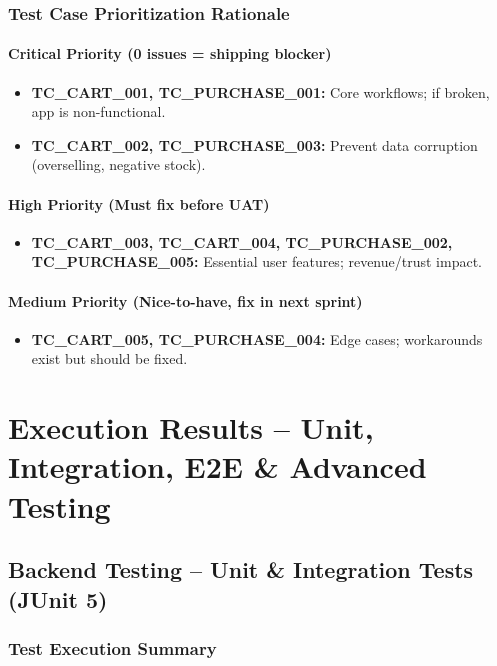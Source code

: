 \documentclass[11pt,a4paper]{article}
\begin{document}
\subsubsection{Test Case Prioritization Rationale}

\paragraph{Critical Priority (0 issues = shipping blocker)}
\begin{itemize}
    \item \textbf{TC\_CART\_001, TC\_PURCHASE\_001:} Core workflows; if broken, app is non-functional.
    \item \textbf{TC\_CART\_002, TC\_PURCHASE\_003:} Prevent data corruption (overselling, negative stock).
\end{itemize}

\paragraph{High Priority (Must fix before UAT)}
\begin{itemize}
    \item \textbf{TC\_CART\_003, TC\_CART\_004, TC\_PURCHASE\_002, TC\_PURCHASE\_005:} Essential user features; revenue/trust impact.
\end{itemize}

\paragraph{Medium Priority (Nice-to-have, fix in next sprint)}
\begin{itemize}
    \item \textbf{TC\_CART\_005, TC\_PURCHASE\_004:} Edge cases; workarounds exist but should be fixed.
\end{itemize}

\section{Execution Results -- Unit, Integration, E2E \& Advanced Testing}

\subsection{Backend Testing -- Unit \& Integration Tests (JUnit 5)}

\subsubsection{Test Execution Summary}
\end{document}
